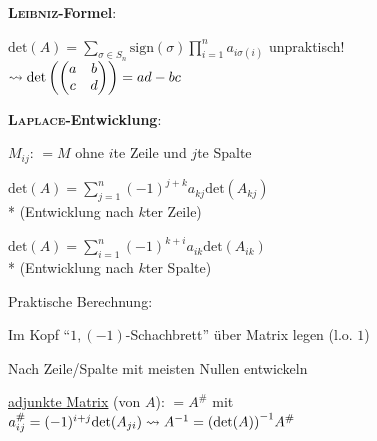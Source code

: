 \textbf{\textsc{Leibniz}-Formel}:
\begin{items}
	\item $\text{det}(A)=\sum_{\sigma \in S_n} \text{sign}(\sigma) \prod_{i=1}^n a_{i \sigma(i)}$ unpraktisch! $ \\* \leadsto \text{det}\left( \begin{pmatrix} a & b \\ c & d \end{pmatrix} \right) = ad-bc$
\end{items}

\textbf{\textsc{Laplace}-Entwicklung}:
\begin{items}
	\item \underline{$M_{ij}$}: $=M$ ohne $i$te Zeile und $j$te Spalte
	\item $\text{det}(A)=\sum_{j=1}^n (-1)^{j+k}a_{kj}\text{det}(A_{kj})$ \\* (Entwicklung nach $k$ter Zeile)
	\item $\text{det}(A)=\sum_{i=1}^n (-1)^{k+i}a_{ik}\text{det}(A_{ik})$ \\* (Entwicklung nach $k$ter Spalte)
	\item Praktische Berechnung:
	\begin{enumeration}
		\item Im Kopf ``$1, (-1)$-Schachbrett'' über Matrix legen (l.o. $1$)
		\item Nach Zeile/Spalte mit meisten Nullen entwickeln
	\end{enumeration}
	\item \underline{adjunkte Matrix} (von $A$): $=A^{\#}$ mit $a_{ij}^\# = (-1)^{i+j} \text{det}(A_{ji}) \\* \leadsto A^{-1}= {(\text{det}(A))}^{-1} A^\#$
\end{items}

